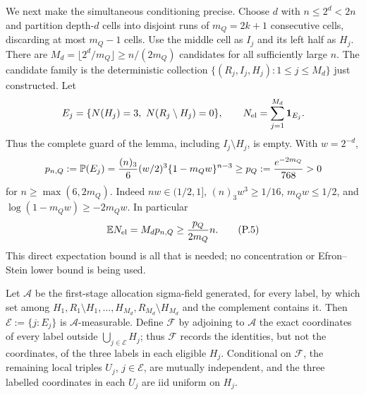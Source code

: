 \documentclass[11pt]{article}
\numberwithin{equation}{section}
\newcommand{\E}{\mathbb E}\newcommand{\Pp}{\mathbb P}
\newcommand{\1}{\mathbf 1}\newcommand{\F}{\mathcal F}\newcommand{\D}{\mathcal D}
\begin{document}
We next make the simultaneous conditioning precise.  Choose $d$ with
$n\le2^d<2n$ and partition depth-$d$ cells into disjoint runs of
$m_Q=2k+1$ consecutive cells, discarding at most $m_Q-1$ cells.  Use the
middle cell as $I_j$ and its left half as $H_j$.  There are
$M_d=\lfloor2^d/m_Q\rfloor\ge n/(2m_Q)$ candidates for all sufficiently
large $n$.  The candidate family is the deterministic collection
$\{(R_j,I_j,H_j):1\le j\le M_d\}$ just constructed.  Let
\[
 E_j=\{N(H_j)=3,\ N(R_j\setminus H_j)=0\},\qquad
 N_{\rm el}=\sum_{j=1}^{M_d}{\bf1}_{E_j}.
\]
Thus the complete guard of the lemma, including $I_j\setminus H_j$, is
empty.  With $w=2^{-d}$,
\begin{equation}
 p_{n,Q}:=\Pp(E_j)={(n)_3\over6}(w/2)^3
       \{1-m_Qw\}^{n-3}\ge p_Q:={e^{-2m_Q}\over768}>0             \label{eq:final-eligible-d}
\end{equation}
for $n\ge\max(6,2m_Q)$.  Indeed $nw\in(1/2,1]$,
$(n)_3w^3\ge1/16$, $m_Qw\le1/2$, and
$\log(1-m_Qw)\ge-2m_Qw$.  In particular
\begin{equation}
 \E N_{\rm el}=M_dp_{n,Q}\ge {p_Q\over2m_Q}n.          \tag{P.5}
\end{equation}
This direct expectation bound is all that is needed; no concentration or
Efron--Stein lower bound is being used.

Let $\mathcal A$ be the first-stage allocation sigma-field generated, for every
label, by which set among $H_1,R_1\setminus H_1,\ldots,H_{M_d},
R_{M_d}\setminus H_{M_d}$ and the complement contains it.  Then
$\mathcal E:=\{j:E_j\}$ is $\mathcal A$-measurable.  Define $\mathcal F$ by
adjoining to $\mathcal A$ the exact coordinates of every label outside
$\bigcup_{j\in\mathcal E}H_j$; thus $\mathcal F$ records the identities, but
not the coordinates, of the three labels in each eligible $H_j$.  Conditional
on $\mathcal F$, the remaining local triples $U_j$, $j\in\mathcal E$, are
mutually independent, and the three labelled coordinates in each $U_j$ are
iid uniform on $H_j$.
\end{document}
